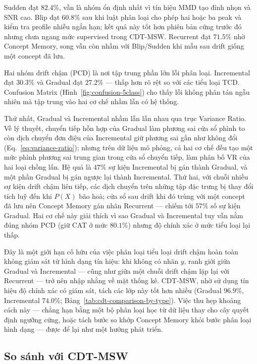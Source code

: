 Sudden đạt $82.4\%$, vẫn là nhóm ổn định nhất vì tín hiệu MMD tạo đỉnh nhọn và SNR cao. Blip đạt $60.8\%$ sau khi luật phân loại cho phép hai hoặc ba peak và kiểm tra profile nhiễu ngắn hạn; kết quả này tốt hơn phiên bản cứng trước đó nhưng chưa ngang mức supervised trong CDT-MSW. Recurrent đạt $71.5\%$ nhờ Concept Memory, song vẫn còn nhầm với Blip/Sudden khi mẫu sau drift giống một concept đã lưu.

Hai nhóm drift chậm (PCD) là nơi tập trung phần lớn lỗi phân loại. Incremental đạt $30.3\%$ và Gradual đạt $27.2\%$ --- thấp hơn rõ rệt so với các tiểu loại TCD. Confusion Matrix (Hình~\ref{fig:confusion-5class}) cho thấy lỗi không phân tán ngẫu nhiên mà tập trung vào hai cơ chế nhầm lẫn có hệ thống.

Thứ nhất, Gradual và Incremental nhầm lẫn lẫn nhau qua trục Variance Ratio. Về lý thuyết, chuyển tiếp hỗn hợp của Gradual làm phương sai cửa sổ phình to còn dịch chuyển đơn điệu của Incremental giữ phương sai gần như không đổi (Eq.~\eqref{eq:variance-ratio}); nhưng trên dữ liệu mô phỏng, cả hai cơ chế đều tạo một mức phình phương sai trung gian trong cửa sổ chuyển tiếp, làm phân bố VR của hai loại chồng lấn. Hệ quả là $47\%$ sự kiện Incremental bị gán thành Gradual, và một phần Gradual bị gán ngược lại thành Incremental. Thứ hai, với chuỗi nhiều sự kiện drift chậm liên tiếp, các dịch chuyển trên những tập đặc trưng bị thay đổi tích luỹ đến khi $P(X)$ bão hoà; cửa sổ sau drift khi đó trùng với một concept đã lưu nên Concept Memory gán nhãn Recurrent --- chiếm tới $57\%$ số sự kiện Gradual. Hai cơ chế này giải thích vì sao Gradual và Incremental tuy vẫn nằm đúng nhóm PCD (giữ CAT ở mức $80.1\%$) nhưng độ chính xác ở mức tiểu loại lại thấp.

Đây là một giới hạn cố hữu của việc phân loại tiểu loại drift chậm hoàn toàn không giám sát từ hình dạng tín hiệu: khi không có nhãn $y$, ranh giới giữa Gradual và Incremental --- cũng như giữa một chuỗi drift chậm lặp lại với Recurrent --- trở nên nhập nhằng về mặt thống kê. CDT-MSW, nhờ sử dụng tín hiệu độ chính xác có giám sát, tách các lớp này tốt hơn nhiều (Gradual $96.9\%$, Incremental $74.0\%$; Bảng~\ref{tab:cdt-comparison-by-type}). Việc thu hẹp khoảng cách này --- chẳng hạn bằng một bộ phân loại học từ dữ liệu thay cho cây quyết định ngưỡng cứng, hoặc tách bước so khớp Concept Memory khỏi bước phân loại hình dạng --- được để lại như một hướng phát triển.

\subsection{So sánh với CDT-MSW}
\label{sec:classification-sota}

